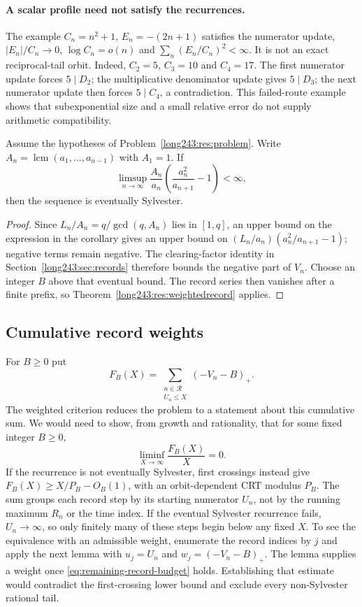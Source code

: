 \documentclass[11pt]{article}
\begin{document}
\paragraph{A scalar profile need not satisfy the recurrences.}
The example $C_n=n^2+1$, $E_n=-(2n+1)$ satisfies the numerator update,
$|E_n|/C_n\to0$, $\log C_n=o(n)$ and $\sum_n(E_n/C_n)^2<\infty$.
It is not an exact reciprocal-tail orbit. Indeed, $C_2=5$, $C_3=10$
and $C_4=17$. The first numerator update forces $5\mid D_2$; the
multiplicative denominator update gives $5\mid D_3$; the next numerator
update then forces $5\mid C_4$, a contradiction. This failed-route
example shows that subexponential size
and a small relative error do not supply arithmetic compatibility.

\begin{corollary}\label{res:lcmbounded}
Assume the hypotheses of Problem~\ref{long243:res:problem}. Write
$A_n=\operatorname{lcm}(a_1,\ldots,a_{n-1})$ with $A_1=1$. If
\[
 \limsup_{n\to\infty}\frac{A_n}{a_n}
 \left(\frac{a_n^2}{a_{n+1}}-1\right)<\infty,
\]
then the sequence is eventually Sylvester.
\end{corollary}

\begin{proof}
Since $L_n/A_n=q/\gcd(q,A_n)$ lies in $[1,q]$, an upper bound on the
expression in the corollary gives an upper bound on
$(L_n/a_n)(a_n^2/a_{n+1}-1)$; negative terms remain negative.
The clearing-factor identity in Section~\ref{long243:sec:records} therefore bounds the
negative part of $V_n$. Choose an integer $B$ above
that eventual bound. The record series then vanishes after a finite prefix,
so Theorem~\ref{long243:res:weightedrecord} applies.
\end{proof}

\subsection{Cumulative record weights}
For $B\ge0$ put
\[
 F_B(X)=\sum_{\substack{n\in\mathcal R\\U_n\le X}}(-V_n-B)_+.
\]
The weighted criterion reduces the problem to a statement about this
cumulative sum. We would need to show, from growth and rationality,
that for some fixed integer $B\ge0$,
\begin{equation}\label{eq:remaining-record-budget}
 \liminf_{X\to\infty}\frac{F_B(X)}X=0.
\end{equation}
If the recurrence is not eventually Sylvester, first crossings instead give
$F_B(X)\ge X/P_B-O_B(1)$, with an orbit-dependent CRT modulus $P_B$.
The sum groups each record step by its starting numerator $U_n$, not by
the running maximum $R_n$ or the time index. If the eventual Sylvester
recurrence fails,
$U_n\to\infty$, so only finitely many of these steps begin below any
fixed $X$.
To see the equivalence with an admissible weight, enumerate the record
indices by $j$ and apply the next lemma with $u_j=U_n$ and
$w_j=(-V_n-B)_+$. The lemma supplies a weight once
\eqref{eq:remaining-record-budget} holds. Establishing that estimate
would contradict the first-crossing lower bound and exclude every
non-Sylvester rational tail.
\end{document}
